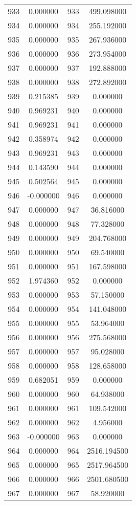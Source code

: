 \documentclass[12pt]{article}
\begin{document}
\begin{longtable}{@{}cccc@{}}
933 & 0.000000 & 933 & 499.098000 \\
934 & 0.000000 & 934 & 255.192000 \\
935 & 0.000000 & 935 & 267.936000 \\
936 & 0.000000 & 936 & 273.954000 \\
937 & 0.000000 & 937 & 192.888000 \\
938 & 0.000000 & 938 & 272.892000 \\
939 & 0.215385 & 939 & 0.000000 \\
940 & 0.969231 & 940 & 0.000000 \\
941 & 0.969231 & 941 & 0.000000 \\
942 & 0.358974 & 942 & 0.000000 \\
943 & 0.969231 & 943 & 0.000000 \\
944 & 0.143590 & 944 & 0.000000 \\
945 & 0.502564 & 945 & 0.000000 \\
946 & -0.000000 & 946 & 0.000000 \\
947 & 0.000000 & 947 & 36.816000 \\
948 & 0.000000 & 948 & 77.328000 \\
949 & 0.000000 & 949 & 204.768000 \\
950 & 0.000000 & 950 & 69.540000 \\
951 & 0.000000 & 951 & 167.598000 \\
952 & 1.974360 & 952 & 0.000000 \\
953 & 0.000000 & 953 & 57.150000 \\
954 & 0.000000 & 954 & 141.048000 \\
955 & 0.000000 & 955 & 53.964000 \\
956 & 0.000000 & 956 & 275.568000 \\
957 & 0.000000 & 957 & 95.028000 \\
958 & 0.000000 & 958 & 128.658000 \\
959 & 0.682051 & 959 & 0.000000 \\
960 & 0.000000 & 960 & 64.938000 \\
961 & 0.000000 & 961 & 109.542000 \\
962 & 0.000000 & 962 & 4.956000 \\
963 & -0.000000 & 963 & 0.000000 \\
964 & 0.000000 & 964 & 2516.194500 \\
965 & 0.000000 & 965 & 2517.964500 \\
966 & 0.000000 & 966 & 2501.680500 \\
967 & 0.000000 & 967 & 58.920000 \\

\end{longtable}
\end{document}
